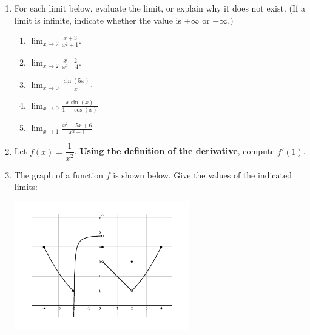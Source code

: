 \documentclass[12pt]{article}
\newcommand{\points}[1]{\marginpar{\hspace{24pt}[#1]}}
\newcommand{\di}{\displaystyle}
\begin{document}
\begin{enumerate}
\item For each limit below, evaluate the limit, or explain why it does not exist. (If a limit is infinite, indicate whether the value is $+\infty$ or $-\infty$.)
\begin{enumerate}
 \item $\di \lim_{x\to 2}\frac{x+3}{x^2+1}$. \points{2}

\vspace{1in}

 \item $\di \lim_{x\to 2}\frac{x-2}{x^2-4}$. \points{2}

\vspace{1in}

 \item $\di \lim_{x \to 0}\frac{\sin(5x)}{x}$. \points{2}

\vspace{1.5in}

 \item $\di \lim_{x \to 0}\frac{x\sin(x)}{1-\cos(x)}$ \points{2}

\vspace{1.5in}

 \item $\di \lim_{x\to 1}\frac{x^2-5x+6}{x^2-1}$ \points{2}

\end{enumerate}
\newpage

\item Let $f(x) = \dfrac{1}{x^2}$. \textbf{Using the definition of the derivative}, compute $f'(1)$. \points{4}


\vspace{3.5in}


\item The graph of a function $f$ is shown below. Give the values of the indicated limits:\points{6}

\bigskip


\begin{vwcol}[widths={0.6,0.4},
 sep=.8cm, justify=flush,rule=0pt,indent=1em]
\noindent\hglue-12pt \includegraphics[width=0.6\textwidth]{FE-3}



\end{vwcol}
\end{enumerate}
\end{document}
